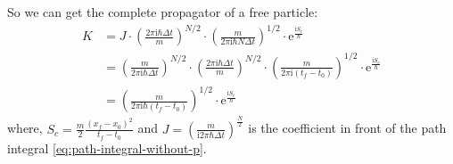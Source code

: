 \begin{example}
    So we can get the complete propagator of a free particle:
    \begin{equation}
    \begin{aligned}
    K &= J \cdot \left(\frac{2\pi\mathrm{i}\hbar\Delta t}{m}\right)^{N/2} \cdot \left(\frac{m}{2\pi\mathrm{i} \hbar N\Delta t}\right)^{1/2} \cdot \mathrm{e}^{\frac{\mathrm{i}S_c}{\hbar}} \\
    &= \left(\frac{m}{2\pi\mathrm{i}\hbar\Delta t}\right)^{N/2} \cdot \left(\frac{2\pi\mathrm{i}\hbar\Delta t}{m}\right)^{N/2} \cdot \left(\frac{m}{2\pi\mathrm{i}(t_f-t_0)}\right)^{1/2} \cdot \mathrm{e}^{\frac{\mathrm{i}S_c}{\hbar}} \\
    &= \left(\frac{m}{2\pi\mathrm{i} \hbar (t_f-t_0)}\right)^{1/2} \cdot \mathrm{e}^{\frac{\mathrm{i}S_c}{\hbar}}
    \end{aligned}
    \end{equation}
    where, $S_c = \frac{m}{2} \frac{(x_f-x_0)^2}{t_f-t_0}$ 
    and $J = \left( \frac{m}{\mathrm{i} 2\pi\hbar\Delta t} \right)^{\frac{N}{2}}$
    is the coefficient in front of the path integral \ref{eq:path-integral-without-p}.

\end{example}